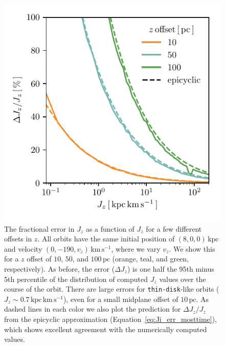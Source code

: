 \documentclass[twocolumn]{aastex62}
\newcommand{\pc}{\text{pc}}
\newcommand{\kpc}{\text{kpc}}
\newcommand{\kms}{\text{km}\,\text{s}^{-1}}
\newcommand{\actunit}{\text{kpc}\,\kms}
\newcommand{\thin}{\texttt{thin-disk}}
\begin{document}
\begin{figure}
\begin{center}
\includegraphics[width=\columnwidth]{fig/schmactions_many_orbits_Jz_fun.pdf}
\end{center}
\caption{The fractional error in $J_z$ as a function of $J_z$ for a few
different offsets in $z$. All orbits have the same initial position of $(8, 0,
0)\,\kpc$ and velocity $(0, -190, v_z)\,\kms$, where we vary
$v_z$. We show this for a $z$ offset of $10$, $50$,
and $100\,\pc$ (orange, teal, and green, respectively). As before, the error
($\Delta J_z$) is one half the 95th minus 5th percentile of the distribution
of computed $J_z$ values over the course of the orbit. There are large errors
for \thin{}-like orbits ($J_z \sim 0.7\,\actunit$), even for a small midplane
offset of $10\,\pc$. As dashed lines in each color we also plot the prediction
for $\Delta J_z/J_z$ from the epicyclic approximation
(Equation~\eqref{eq:Ji_err_mosttime}), which shows excellent agreement with
the numerically computed values.}
\label{fig:dJz_fun_Jz}
\end{figure}
\end{document}

